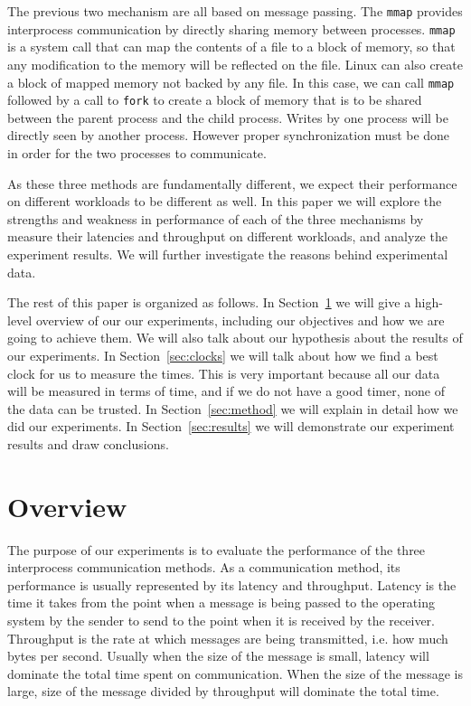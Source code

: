 \documentclass{article}
\begin{document}
The previous two mechanism are all based on message passing.
The \texttt{mmap} provides interprocess communication by directly sharing memory between processes.
\texttt{mmap} is a system call that can map the contents of a file to a block of memory, so that any modification to the memory will be reflected on the file.
Linux can also create a block of mapped memory not backed by any file.
In this case, we can call \texttt{mmap} followed by a call to \texttt{fork} to create a block of memory that is to be shared between the parent process and the child process.
Writes by one process will be directly seen by another process.
However proper synchronization must be done in order for the two processes to communicate.

As these three methods are fundamentally different, we expect their performance on different workloads to be different as well.
In this paper we will explore the strengths and weakness in performance of each of the three mechanisms by measure their latencies and throughput on different workloads, and analyze the experiment results.
We will further investigate the reasons behind experimental data.

The rest of this paper is organized as follows.
In Section~\ref{sec:overview} we will give a high-level overview of our our experiments, including our objectives and how we are going to achieve them.
We will also talk about our hypothesis about the results of our experiments.
In Section~\ref{sec:clocks} we will talk about how we find a best clock for us to measure the times.
This is very important because all our data will be measured in terms of time, and if we do not have a good timer, none of the data can be trusted.
In Section~\ref{sec:method} we will explain in detail how we did our experiments.
In Section~\ref{sec:results} we will demonstrate our experiment results and draw conclusions.

\section{Overview}
\label{sec:overview}
The purpose of our experiments is to evaluate the performance of the three interprocess communication methods.
As a communication method, its performance is usually represented by its latency and throughput.
Latency is the time it takes from the point when a message is being passed to the operating system by the sender to send to the point when it is received by the receiver.
Throughput is the rate at which messages are being transmitted, i.e. how much bytes per second.
Usually when the size of the message is small, latency will dominate the total time spent on communication.
When the size of the message is large, size of the message divided by throughput will dominate the total time.
\end{document}
